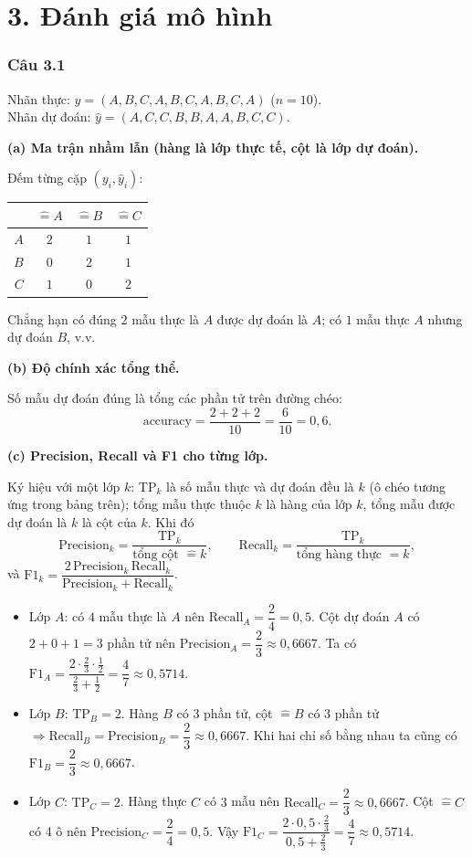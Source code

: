 \section*{3. Đánh giá mô hình}

\subsubsection*{Câu 3.1}

Nhãn thực: $y=(A,B,C,A,B,C,A,B,C,A)$ ($n=10$).\\
Nhãn dự đoán: $\hat y=(A,C,C,B,B,A,A,B,C,C)$.

\medskip
\textbf{(a) Ma trận nhầm lẫn (hàng là lớp thực tế, cột là lớp dự đoán).}

Đếm từng cặp $(y_i,\hat y_i)$:
\begin{center}
\small
\begin{tabular}{r|ccc}
{} & $\hat=A$ & $\hat=B$ & $\hat=C$ \\
\hline
$A$ & $2$ & $1$ & $1$ \\
$B$ & $0$ & $2$ & $1$ \\
$C$ & $1$ & $0$ & $2$ \\
\end{tabular}
\end{center}
Chẳng hạn có đúng $2$ mẫu thực là $A$ được dự đoán là $A$; có $1$ mẫu thực $A$ nhưng dự đoán $B$, v.v.

\medskip
\textbf{(b) Độ chính xác tổng thể.}

Số mẫu dự đoán đúng là tổng các phần tử trên đường chéo:
\[
\text{accuracy}=\frac{2+2+2}{10}=\frac{6}{10}=0{,}6.
\]

\medskip
\textbf{(c) Precision, Recall và F1 cho từng lớp.}

Ký hiệu với một lớp $k$: $\text{TP}_k$ là số mẫu thực và dự đoán đều là $k$ (ô chéo tương ứng trong bảng trên); tổng mẫu thực thuộc $k$ là hàng của lớp $k$, tổng mẫu được dự đoán là $k$ là cột của $k$. Khi đó
\[
\text{Precision}_k=\frac{\text{TP}_k}{\text{tổng cột }\hat=k},\qquad
\text{Recall}_k=\frac{\text{TP}_k}{\text{tổng hàng thực }=k},
\]
và $\text{F1}_k=\dfrac{2\,\text{Precision}_k\,\text{Recall}_k}{\text{Precision}_k+\text{Recall}_k}$.

\begin{itemize}
  \item Lớp $A$: có $4$ mẫu thực là $A$ nên $\text{Recall}_A=\dfrac{2}{4}=0{,}5$. Cột dự đoán $A$ có $2+0+1=3$ phần tử nên $\text{Precision}_A=\dfrac{2}{3}\approx 0{,}6667$.
    Ta có $\text{F1}_A=\dfrac{2\cdot \frac23\cdot \frac12}{\frac23+\frac12}=\dfrac{4}{7}\approx 0{,}5714$.
  \item Lớp $B$: $\text{TP}_B=2$. Hàng $B$ có $3$ phần tử, cột $\hat=B$ có $3$ phần tử $\Rightarrow\text{Recall}_B=\text{Precision}_B=\dfrac{2}{3}\approx 0{,}6667$.
    Khi hai chỉ số bằng nhau ta cũng có $\text{F1}_B=\dfrac23\approx 0{,}6667$.
  \item Lớp $C$: $\text{TP}_C=2$. Hàng thực $C$ có $3$ mẫu nên $\text{Recall}_C=\dfrac{2}{3}\approx 0{,}6667$. Cột $\hat=C$ có $4$ ô nên $\text{Precision}_C=\dfrac{2}{4}=0{,}5$.
    Vậy $\text{F1}_C=\dfrac{2\cdot 0{,}5\cdot \frac23}{0{,}5+\frac23}=\dfrac{4}{7}\approx 0{,}5714$.
\end{itemize}

